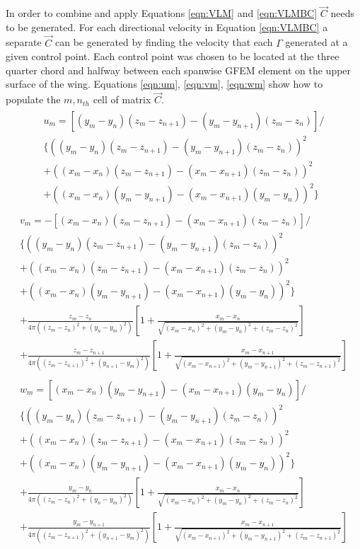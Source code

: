 \documentclass[11pt]{ucthesis}
\begin{document}
In order to combine and apply Equations \ref{eqn:VLM} and \ref{eqn:VLMBC} $\vec{C}$ needs to be generated. For each directional velocity in Equation \ref{eqn:VLMBC} a separate $\vec{C}$ can be generated by finding the velocity that each $\Gamma$ generated at a given control point. Each control point was chosen to be located at the three quarter chord and halfway between each spanwise GFEM element on the upper surface of the wing. Equations \ref{eqn:um}, \ref{eqn:vm}, \ref{eqn:wm} show how to populate the $m,n_{th}$ cell of matrix $\vec{C}$.
\begin{eqnarray}
    \begin{array}{ll}
        u_m = [(y_m-y_n)(z_m-z_{n+1})-(y_m-y_{n+1})(z_m-z_n)]/\\
        \{((y_m-y_n)(z_m-z_{n+1})-(y_m-y_{n+1})(z_m-z_n))^2\\
        +((x_m-x_n)(z_m-z_{n+1})-(x_m-x_{n+1})(z_m-z_n))^2\\
        +((x_m-x_n)(y_m-y_{n+1})-(x_m-x_{n+1})(y_m-y_n))^2\}
    \end{array}
\label{eqn:um}
\end{eqnarray}
\begin{eqnarray}
    \begin{array}{ll}
        v_m = -[(x_m-x_n)(z_m-z_{n+1})-(x_m-x_{n+1})(z_m-z_n)]/\\
        \{((y_m-y_n)(z_m-z_{n+1})-(y_m-y_{n+1})(z_m-z_n))^2\\
        +((x_m-x_n)(z_m-z_{n+1})-(x_m-x_{n+1})(z_m-z_n))^2\\
        +((x_m-x_n)(y_m-y_{n+1})-(x_m-x_{n+1})(y_m-y_n))^2\}\\
        +\frac{z_m-z_n}{4\pi((z_m-z_n)^2+(y_n-y_m)^2)}\left[1+\frac{x_m-x_n}{\sqrt{(x_m-x_n)^2+(y_m-y_n)^2+(z_m-z_n)^2}}\right]\\
        +\frac{z_m-z_{n+1}}{4\pi((z_m-z_{n+1})^2+(y_{n+1}-y_m)^2)}\left[1+\frac{x_m-x_{n+1}}{\sqrt{(x_m-x_{n+1})^2+(y_m-y_{n+1})^2+(z_m-z_{n+1})^2}}\right]
    \end{array}
\label{eqn:vm}
\end{eqnarray}
\begin{eqnarray}
    \begin{array}{ll}
        w_m = [(x_m-x_n)(y_m-y_{n+1})-(x_m-x_{n+1})(y_m-y_n)]/\\
        \{((y_m-y_n)(z_m-z_{n+1})-(y_m-y_{n+1})(z_m-z_n))^2\\
        +((x_m-x_n)(z_m-z_{n+1})-(x_m-x_{n+1})(z_m-z_n))^2\\
        +((x_m-x_n)(y_m-y_{n+1})-(x_m-x_{n+1})(y_m-y_n))^2\}\\
        +\frac{y_m-y_n}{4\pi((z_m-z_n)^2+(y_n-y_m)^2)}\left[1+\frac{x_m-x_n}{\sqrt{(x_m-x_n)^2+(y_m-y_n)^2+(z_m-z_n)^2}}\right]\\
        +\frac{y_m-y_{n+1}}{4\pi((z_m-z_{n+1})^2+(y_{n+1}-y_m)^2)}\left[1+\frac{x_m-x_{n+1}}{\sqrt{(x_m-x_{n+1})^2+(y_m-y_{n+1})^2+(z_m-z_{n+1})^2}}\right]
    \end{array}
\label{eqn:wm}
\end{eqnarray}
\end{document}

